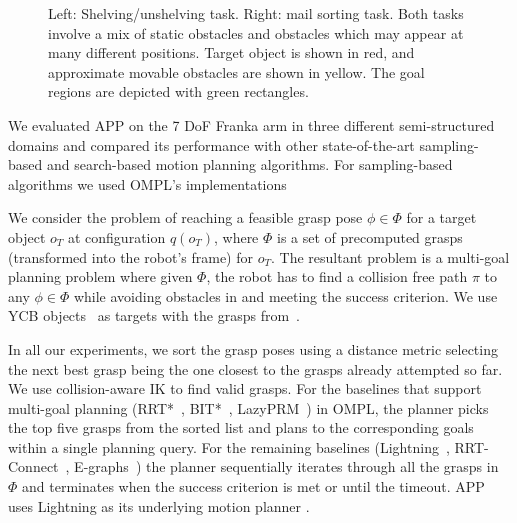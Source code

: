 \documentclass[a4paper]{report}
\begin{document}
\begin{figure}
\centering
\caption{Left: Shelving/unshelving task. Right: mail sorting task. Both tasks involve a mix of static obstacles and obstacles which may appear at many different positions. Target object is shown in red, and approximate movable obstacles are shown in yellow. The goal regions are depicted with green rectangles.}
\label{fig:scenarios}
\end{figure}

We evaluated APP on the 7 DoF Franka arm in three different semi-structured domains and compared its performance with other state-of-the-art sampling-based and search-based motion planning algorithms. For sampling-based algorithms we used OMPL's implementations~\cite{sucan2012open}

We consider the problem of reaching a feasible grasp pose $\phi \in \Phi$ for a target object $o_T$ at configuration $q(o_T)$, where $\Phi$ is a set of precomputed grasps (transformed into the robot's frame) for $o_T$. The resultant problem is a multi-goal planning problem where given $\Phi$, the robot has to find a collision free path $\pi$ to any $\phi \in \Phi$ while avoiding obstacles in \calW and meeting the success criterion. We use YCB objects~\cite{calli2015ycb} as targets with the grasps from~\cite{eppner2019billion}.

In all our experiments, we sort the grasp poses using a distance metric selecting the next best grasp being the one closest to the grasps already attempted so far. We use collision-aware IK to find valid grasps. For the baselines that support multi-goal planning (RRT*~\cite{karaman2011sampling}, BIT*~\cite{gammell2020batch}, LazyPRM~\cite{kavraki2000path}) in OMPL, the planner picks the top five grasps from the sorted list and plans to the corresponding goals within a single planning query. For the remaining baselines (Lightning~\cite{berenson2012robot}, RRT-Connect~\cite{kuffner2000rrt}, E-graphs~\cite{Phillips-RSS-12}) the planner sequentially iterates through all the grasps in $\Phi$ and terminates when the success criterion is met or until the timeout. APP uses Lightning as its underlying motion planner \calP.
\end{document}
